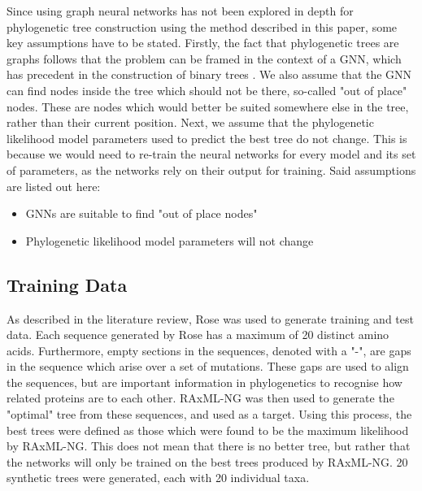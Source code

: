 \documentclass{mpaper}
\begin{document}
Since using graph neural networks has not been explored in depth for phylogenetic tree construction using the method described in this paper, some key assumptions have to be stated. Firstly, the fact that phylogenetic trees are graphs follows that the problem can be framed in the context of a GNN, which has precedent in the construction of binary trees \cite{bahri2021binary}. We also assume that the GNN can find nodes inside the tree which should not be there, so-called "out of place" nodes. These are nodes which would better be suited somewhere else in the tree, rather than their current position. Next, we assume that the phylogenetic likelihood model parameters used to predict the best tree do not change. This is because we would need to re-train the neural networks for every model and its set of parameters, as the networks rely on their output for training. Said assumptions are listed out here:

\begin{itemize}
    \item GNNs are suitable to find "out of place nodes"
    \item Phylogenetic likelihood model parameters will not change
\end{itemize}

\subsection{Training Data}

As described in the literature review, Rose was used to generate training and test data. Each sequence generated by Rose has a maximum of 20 distinct amino acids. Furthermore, empty sections in the sequences, denoted with a "-", are gaps in the sequence which arise over a set of mutations. These gaps are used to align the sequences, but are important information in phylogenetics to recognise how related proteins are to each other. RAxML-NG was then used to generate the "optimal" tree from these sequences, and used as a target. Using this process, the best trees were defined as those which were found to be the maximum likelihood by RAxML-NG. This does not mean that there is no better tree, but rather that the networks will only be trained on the best trees produced by RAxML-NG. 20 synthetic trees were generated, each with 20 individual taxa.
\end{document}
